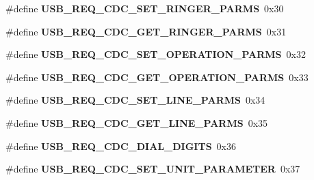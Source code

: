 \begin{DoxyCompactItemize}
\item 
\hypertarget{group__cdc__protocol__group_gaacab4e30847dde3f01d792290ebea666}{\#define {\bfseries U\-S\-B\-\_\-\-R\-E\-Q\-\_\-\-C\-D\-C\-\_\-\-S\-E\-T\-\_\-\-R\-I\-N\-G\-E\-R\-\_\-\-P\-A\-R\-M\-S}~0x30}\label{group__cdc__protocol__group_gaacab4e30847dde3f01d792290ebea666}

\item 
\hypertarget{group__cdc__protocol__group_gafb80f6a095d4508e211ed5e775b2c500}{\#define {\bfseries U\-S\-B\-\_\-\-R\-E\-Q\-\_\-\-C\-D\-C\-\_\-\-G\-E\-T\-\_\-\-R\-I\-N\-G\-E\-R\-\_\-\-P\-A\-R\-M\-S}~0x31}\label{group__cdc__protocol__group_gafb80f6a095d4508e211ed5e775b2c500}

\item 
\hypertarget{group__cdc__protocol__group_gad3375aed1f7a5e7df4685126d66f09b6}{\#define {\bfseries U\-S\-B\-\_\-\-R\-E\-Q\-\_\-\-C\-D\-C\-\_\-\-S\-E\-T\-\_\-\-O\-P\-E\-R\-A\-T\-I\-O\-N\-\_\-\-P\-A\-R\-M\-S}~0x32}\label{group__cdc__protocol__group_gad3375aed1f7a5e7df4685126d66f09b6}

\item 
\hypertarget{group__cdc__protocol__group_ga69f047ea3ec9e3a356ff005a81a6dbad}{\#define {\bfseries U\-S\-B\-\_\-\-R\-E\-Q\-\_\-\-C\-D\-C\-\_\-\-G\-E\-T\-\_\-\-O\-P\-E\-R\-A\-T\-I\-O\-N\-\_\-\-P\-A\-R\-M\-S}~0x33}\label{group__cdc__protocol__group_ga69f047ea3ec9e3a356ff005a81a6dbad}

\item 
\hypertarget{group__cdc__protocol__group_ga3683e27c05ec1d65d1a22a014b665792}{\#define {\bfseries U\-S\-B\-\_\-\-R\-E\-Q\-\_\-\-C\-D\-C\-\_\-\-S\-E\-T\-\_\-\-L\-I\-N\-E\-\_\-\-P\-A\-R\-M\-S}~0x34}\label{group__cdc__protocol__group_ga3683e27c05ec1d65d1a22a014b665792}

\item 
\hypertarget{group__cdc__protocol__group_gafe2f2f77e0f6fa768d3fae25131ef7fb}{\#define {\bfseries U\-S\-B\-\_\-\-R\-E\-Q\-\_\-\-C\-D\-C\-\_\-\-G\-E\-T\-\_\-\-L\-I\-N\-E\-\_\-\-P\-A\-R\-M\-S}~0x35}\label{group__cdc__protocol__group_gafe2f2f77e0f6fa768d3fae25131ef7fb}

\item 
\hypertarget{group__cdc__protocol__group_ga68985a9191870bd17d55657d413a17da}{\#define {\bfseries U\-S\-B\-\_\-\-R\-E\-Q\-\_\-\-C\-D\-C\-\_\-\-D\-I\-A\-L\-\_\-\-D\-I\-G\-I\-T\-S}~0x36}\label{group__cdc__protocol__group_ga68985a9191870bd17d55657d413a17da}

\item 
\hypertarget{group__cdc__protocol__group_gaa9d1d583e759b94bec18d8ae2c5b830c}{\#define {\bfseries U\-S\-B\-\_\-\-R\-E\-Q\-\_\-\-C\-D\-C\-\_\-\-S\-E\-T\-\_\-\-U\-N\-I\-T\-\_\-\-P\-A\-R\-A\-M\-E\-T\-E\-R}~0x37}\label{group__cdc__protocol__group_gaa9d1d583e759b94bec18d8ae2c5b830c}


\end{DoxyCompactItemize}
